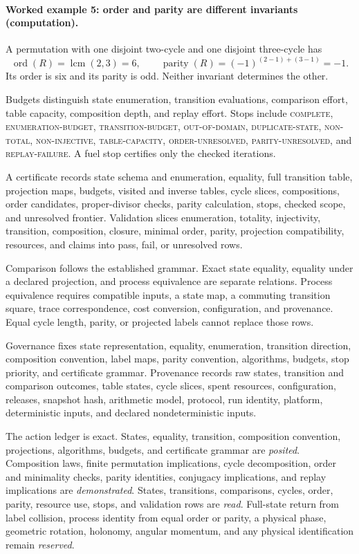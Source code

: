 \paragraph{Worked example 5: order and parity are different invariants (computation).}
A permutation with one disjoint two-cycle and one disjoint three-cycle has
\[
\operatorname{ord}(R)=\operatorname{lcm}(2,3)=6,
\qquad
\operatorname{parity}(R)=(-1)^{(2-1)+(3-1)}=-1.
\]
Its order is six and its parity is odd.  Neither invariant determines the other.

Budgets distinguish state enumeration, transition evaluations, comparison effort, table capacity, composition depth,
and replay effort.  Stops include \textsc{complete}, \textsc{enumeration-budget}, \textsc{transition-budget},
\textsc{out-of-domain}, \textsc{duplicate-state}, \textsc{non-total}, \textsc{non-injective},
\textsc{table-capacity}, \textsc{order-unresolved}, \textsc{parity-unresolved}, and \textsc{replay-failure}.  A fuel
stop certifies only the checked iterations.

A certificate records state schema and enumeration, equality, full transition table, projection maps, budgets,
visited and inverse tables, cycle slices, compositions, order candidates, proper-divisor checks, parity calculation,
stops, checked scope, and unresolved frontier.  Validation slices enumeration, totality, injectivity, transition,
composition, closure, minimal order, parity, projection compatibility, resources, and claims into pass, fail, or
unresolved rows.

Comparison follows the established grammar.  Exact state equality, equality under a declared projection, and process
equivalence are separate relations.  Process equivalence requires compatible inputs, a state map, a commuting
transition square, trace correspondence, cost conversion, configuration, and provenance.  Equal cycle length, parity,
or projected labels cannot replace those rows.

Governance fixes state representation, equality, enumeration, transition direction, composition convention, label
maps, parity convention, algorithms, budgets, stop priority, and certificate grammar.  Provenance records raw states,
transition and comparison outcomes, table states, cycle slices, spent resources, configuration, releases, snapshot
hash, arithmetic model, protocol, run identity, platform, deterministic inputs, and declared nondeterministic inputs.

The action ledger is exact.  States, equality, transition, composition convention, projections, algorithms, budgets,
and certificate grammar are \emph{posited}.  Composition laws, finite permutation implications, cycle decomposition,
order and minimality checks, parity identities, conjugacy implications, and replay implications are
\emph{demonstrated}.  States, transitions, comparisons, cycles, order, parity, resource use, stops, and validation
rows are \emph{read}.  Full-state return from label collision, process identity from equal order or parity, a physical
phase, geometric rotation, holonomy, angular momentum, and any physical identification remain \emph{reserved}.

